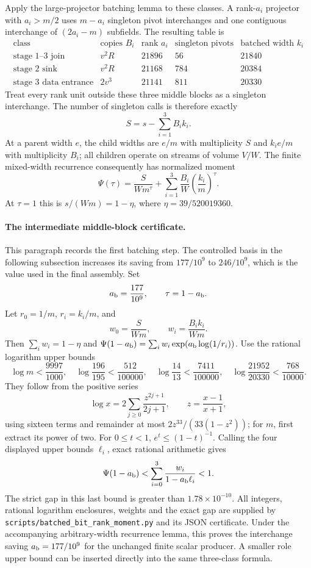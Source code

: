 Apply the large-projector batching lemma to these classes. A rank-$a_i$
projector with $a_i>m/2$ uses $m-a_i$ singleton pivot interchanges and
one contiguous interchange of $(2a_i-m)$ subfields. The resulting table is
\[
\begin{array}{c|r|r|r|r}
 \text{class}&\text{copies }B_i&\text{rank }a_i&
          \text{singleton pivots}&\text{batched width }k_i\\\hline
 \text{stage 1--3 join}&v^2R&21896&56&21840\\
 \text{stage 2 sink}&v^2R&21168&784&20384\\
 \text{stage 3 data entrance}&2v^3&21141&811&20330
\end{array}
\]
Treat every rank unit outside these three middle blocks as a singleton
interchange. The number of singleton calls is therefore exactly
\[
 S=s-\sum_{i=1}^3B_i k_i.
\]
At a parent width $e$, the child widths are $e/m$ with multiplicity $S$
and $k_i e/m$ with multiplicity $B_i$; all children operate on streams of
volume $V/W$. The finite mixed-width recurrence consequently has normalized
moment
\[
 \Psi(\tau)=\frac{S}{Wm^\tau}
   +\sum_{i=1}^3\frac{B_i}{W}\left(\frac{k_i}{m}\right)^\tau.
\]
At $\tau=1$ this is $s/(Wm)=1-\eta$, where
$\eta=39/520019360$.

\paragraph{The intermediate middle-block certificate.}
This paragraph records the first batching step. The controlled basis in
the following subsection increases its saving from $177/10^9$ to
$246/10^9$, which is the value used in the final assembly.
Set
\[
 a_{\rm b}=\frac{177}{10^9},\qquad \tau=1-a_{\rm b}.
\]
Let $r_0=1/m$, $r_i=k_i/m$, and
\[
 w_0=\frac S{Wm},\qquad w_i=\frac{B_i k_i}{Wm}.
\]
Then $\sum_iw_i=1-\eta$ and
$\Psi(1-a_{\rm b})=\sum_iw_i\exp(a_{\rm b}\log(1/r_i))$.
Use the rational logarithm upper bounds
\[
 \log m<\frac{9997}{1000},\quad
 \log\frac{196}{195}<\frac{512}{100000},\quad
 \log\frac{14}{13}<\frac{7411}{100000},\quad
 \log\frac{21952}{20330}<\frac{768}{10000}.
\]
They follow from the positive series
\[
 \log x=2\sum_{j\ge0}\frac{z^{2j+1}}{2j+1},\qquad
 z=\frac{x-1}{x+1},
\]
using sixteen terms and remainder at most
$2z^{33}/(33(1-z^2))$; for $m$, first extract its power of two.
For $0\le t<1$, $e^t\le(1-t)^{-1}$. Calling the four displayed upper
bounds $\ell_i$, exact rational arithmetic gives
\[
 \Psi(1-a_{\rm b})
 <\sum_{i=0}^3\frac{w_i}{1-a_{\rm b}\ell_i}<1.
\]
The strict gap in this last bound is greater than $1.78\times10^{-10}$.
All integers, rational logarithm enclosures, weights and the exact gap are
supplied by \texttt{scripts/batched\_bit\_rank\_moment.py} and its JSON
certificate. Under the accompanying arbitrary-width recurrence lemma,
this proves the interchange saving $a_{\rm b}=177/10^9$ for the unchanged
finite scalar producer. A smaller role upper bound can be inserted directly
into the same three-class formula.
